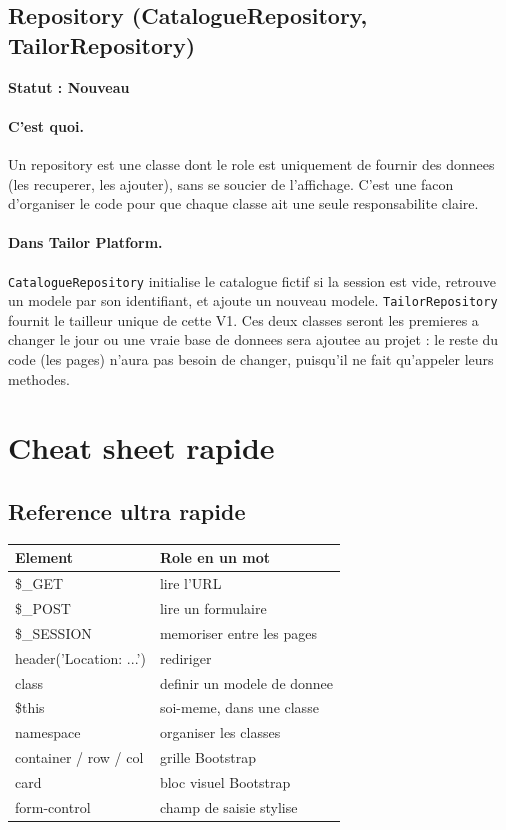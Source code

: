 \documentclass[11pt,a4paper]{article}
\newcommand{\statut}[1]{\textbf{Statut : #1}}
\begin{document}
\subsection{Repository (CatalogueRepository, TailorRepository)}

\statut{Nouveau}

\paragraph{C'est quoi.}
Un repository est une classe dont le role est uniquement de fournir des
donnees (les recuperer, les ajouter), sans se soucier de l'affichage. C'est
une facon d'organiser le code pour que chaque classe ait une seule
responsabilite claire.

\paragraph{Dans Tailor Platform.}
\verb|CatalogueRepository| initialise le catalogue fictif si la session est
vide, retrouve un modele par son identifiant, et ajoute un nouveau modele.
\verb|TailorRepository| fournit le tailleur unique de cette V1. Ces deux
classes seront les premieres a changer le jour ou une vraie base de donnees
sera ajoutee au projet : le reste du code (les pages) n'aura pas besoin de
changer, puisqu'il ne fait qu'appeler leurs methodes.

\section{Cheat sheet rapide}

\subsection{Reference ultra rapide}

\begin{longtable}{|l|l|}
\hline
\textbf{Element} & \textbf{Role en un mot} \\
\hline
\$\_GET & lire l'URL \\
\hline
\$\_POST & lire un formulaire \\
\hline
\$\_SESSION & memoriser entre les pages \\
\hline
header('Location: ...') & rediriger \\
\hline
class & definir un modele de donnee \\
\hline
\$this & soi-meme, dans une classe \\
\hline
namespace & organiser les classes \\
\hline
container / row / col & grille Bootstrap \\
\hline
card & bloc visuel Bootstrap \\
\hline
form-control & champ de saisie stylise \\
\hline
\end{longtable}
\end{document}
